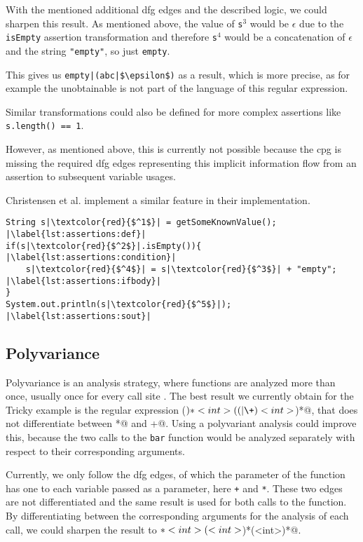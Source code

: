 With the mentioned additional \ac{dfg} edges and the described logic, we could sharpen this result.
As mentioned above, the value of \lstinline|s|$^3$ would be $\epsilon$ due to the \lstinline|isEmpty| assertion transformation and therefore \lstinline|s|$^4$ would be a concatenation of $\epsilon$ and the string \lstinline|"empty"|, so just \lstinline|empty|.

This gives us \lstinline[mathescape]@empty|(abc|$\epsilon$)@ as a result, which is more precise, as for example the unobtainable \Verb@abcempty@ is not part of the language of this regular expression.

Similar transformations could also be defined for more complex assertions like \lstinline|s.length() == 1|.

However, as mentioned above, this is currently not possible because the \ac{cpg} is missing the required \ac{dfg} edges representing this implicit information flow from an assertion to subsequent variable usages. 

Christensen et al. implement a similar feature in their implementation.

\begin{lstlisting}[caption={Assertion Example}, label=lst:assertions, captionpos=b, float, numbers=right, escapechar=|]
String s|\textcolor{red}{$^1$}| = getSomeKnownValue(); |\label{lst:assertions:def}|
if(s|\textcolor{red}{$^2$}|.isEmpty()){ |\label{lst:assertions:condition}|
	s|\textcolor{red}{$^4$}| = s|\textcolor{red}{$^3$}| + "empty"; |\label{lst:assertions:ifbody}|
}
System.out.println(s|\textcolor{red}{$^5$}|); |\label{lst:assertions:sout}|
\end{lstlisting}

\subsection{Polyvariance}\label{sec:futureWork:polyvariance}

Polyvariance is an analysis strategy, where functions are analyzed more than once, usually once for every call site \cite{polyvariance}. The best result we currently obtain for the Tricky example is the regular expression \Verb@(\()*<int>((\*|\+)<int>\))*@, that does not differentiate between \Verb@*@ and \Verb@+@. Using a polyvariant analysis could improve this, because the two calls to the \lstinline|bar| function would be analyzed separately with respect to their corresponding arguments. 

Currently, we only follow the \ac{dfg} edges, of which the parameter of the function has one to each variable passed as a parameter, here \lstinline|+| and \lstinline|*|. These two edges are not differentiated and the same result is used for both calls to the function.
By differentiating between the corresponding arguments for the analysis of each call, we could sharpen the result to \Verb@\(*<int>(\*<int>\))*(\+<int>\))*@.


